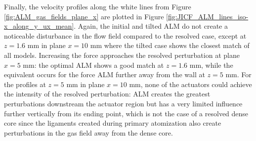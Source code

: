 Finally, the velocity profiles along the white lines from Figure \ref{fig:ALM_gas_fields_plane_x} are plotted in Figure \ref{fig:JICF_ALM_lines_iso-x_along_y_ux_mean}. Again, the initial and tilted ALM do not create a noticeable disturbance in the flow field compared to the resolved case, except at $z = 1.6$ mm in plane $x = 10$ mm where the tilted case shows the closest match of all models. Increasing the force approaches the resolved perturbation at plane $x = 5$ mm: the optimal ALM shows a good match at $z = 1.6$ mm, while the equivalent occurs for the force ALM further away from the wall at $z = 5$ mm. For the profiles at $z = 5$ mm in plane $x = 10$ mm, none of the actuators could achieve the intensity of the resolved perturbation: ALM creates the greatest perturbations downstream the actuator region but has a very limited influence further vertically from its ending point, which is not the case of a resolved dense core since the ligaments created during primary atomization also create perturbations in the gas field away from the dense core. 

